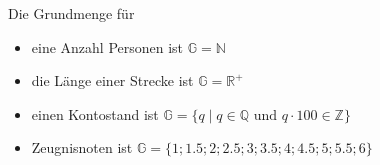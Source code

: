 \begin{example}
  Die Grundmenge für
  \begin{itemize}[noitemsep]
    \item eine Anzahl Personen ist $\mathbb{G} = \mathbb{N}$
    \item die Länge einer Strecke ist $\mathbb{G} = \mathbb{R}^{+}$
    \item einen Kontostand ist $\mathbb{G} =
    \{q \;|\; q\in \mathbb{Q} \text{ und } q\cdot 100 \in \mathbb{Z}\}$
    \item Zeugnisnoten ist $\mathbb{G} = \{1;1.5;2;2.5;3;3.5;4;4.5;5;5.5;6\}$
  \end{itemize}
\end{example}
